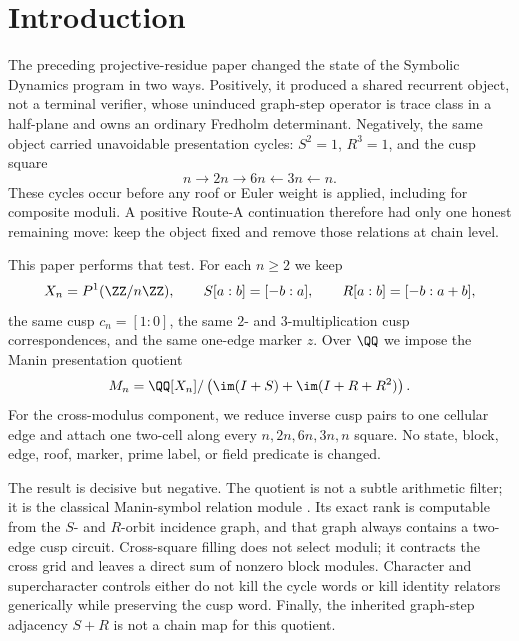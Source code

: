 \section{Introduction}

The preceding projective-residue paper changed the state of the Symbolic
Dynamics program in two ways.  Positively, it produced a shared recurrent
object, not a terminal verifier, whose uninduced graph-step operator is trace
class in a half-plane and owns an ordinary Fredholm determinant.  Negatively,
the same object carried unavoidable presentation cycles: $S^2=1$,
$R^3=1$, and the cusp square
\[
  n\longrightarrow 2n\longrightarrow 6n
  \longleftarrow 3n\longleftarrow n .
\]
These cycles occur before any roof or Euler weight is applied, including for
composite moduli.  A positive Route-A continuation therefore had only one
honest remaining move: keep the object fixed and remove those relations at
chain level.

This paper performs that test.  For each $n\ge2$ we keep
\[
  X_n=P^1(\ZZ/n\ZZ),\qquad
  S[a:b]=[-b:a],\qquad R[a:b]=[-b:a+b],
\]
the same cusp $c_n=[1:0]$, the same $2$- and $3$-multiplication cusp
correspondences, and the same one-edge marker $z$.  Over $\QQ$ we impose the
Manin presentation quotient
\[
  M_n=\QQ[X_n]/
  \left(\im(I+S)+\im(I+R+R^2)\right).
\]
For the cross-modulus component, we reduce inverse cusp pairs to one
cellular edge and attach one two-cell along every $n,2n,6n,3n,n$ square.
No state, block, edge, roof, marker, prime label, or field predicate is
changed.

The result is decisive but negative.  The quotient is not a subtle arithmetic
filter; it is the classical Manin-symbol relation module
\citep{manin1972,merel1991}.  Its exact rank is computable from the
$S$- and $R$-orbit incidence graph, and that graph always contains a two-edge
cusp circuit.  Cross-square filling does not select moduli; it contracts the
cross grid and leaves a direct sum of nonzero block modules.  Character and
supercharacter controls either do not kill the cycle words or kill identity
relators generically while preserving the cusp word.  Finally, the inherited
graph-step adjacency $S+R$ is not a chain map for this quotient.

